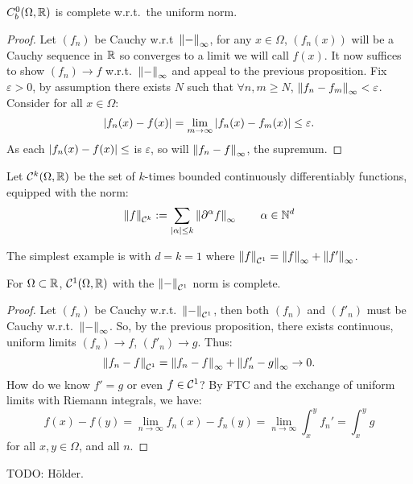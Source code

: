 \documentclass{article}
\begin{document}
\begin{proposition}
    $C_b^0(\Omega,\mathbb{R})$ is complete w.r.t.~the uniform norm.
    \begin{proof}
        Let $(f_n)$ be Cauchy w.r.t~$\left\lVert - \right\rVert_\infty$, for any $x\in \Omega$, $(f_n(x))$ will be a Cauchy sequence in $\mathbb{R}$ so converges to a limit we will call $f(x)$. It now suffices to show $(f_n)\rightarrow f$ w.r.t.~$\left\lVert - \right\rVert_\infty$ and appeal to the previous proposition. Fix $\varepsilon > 0$, by assumption there exists $N$ such that $\forall n,m\geq N$, $\left\lVert f_n-f_m \right\rVert_\infty < \varepsilon$. Consider for all $x\in \Omega$: \[
        \left| f_n(x)-f(x) \right| = \lim_{m\rightarrow\infty}\left| f_n(x)-f_m(x) \right| \leq \varepsilon.
        \] As each $\left| f_n(x)-f(x) \right|\leq$ is  $\varepsilon$, so will $\left\lVert f_n-f \right\rVert_\infty$, the supremum.
    \end{proof}
\end{proposition}

\begin{definition}
    Let $\mathcal{C}^k(\Omega,\mathbb{R})$ be the set of $k$-times bounded continuously differentiably functions, equipped with the norm: \[
    \left\lVert f \right\rVert_{\mathcal{C}^k} := \sum_{\left| \alpha \right|\leq k} \left\lVert \partial^\alpha f \right\rVert_\infty \qquad \alpha \in \mathbb{N}^d
    \]
\end{definition}

The simplest example is with $d=k=1$ where $\left\lVert f \right\rVert_{\mathcal{C}^1} = \left\lVert f \right\rVert_\infty + \left\lVert f' \right\rVert_\infty$.

\begin{proposition}
    For $\Omega\subset \mathbb{R}$, $\mathcal{C}^1(\Omega,\mathbb{R})$ with the $\left\lVert - \right\rVert_{\mathcal{C}^1}$ norm is complete.
    \begin{proof}
        Let $(f_n)$ be Cauchy w.r.t.~$\left\lVert - \right\rVert_{\mathcal{C}^1}$, then both $(f_n)$ and $(f'_n)$ must be Cauchy w.r.t.~$\left\lVert - \right\rVert_\infty$. So, by the previous proposition, there exists continuous, uniform limits $(f_n)\rightarrow f$, $(f'_n)\rightarrow g$. Thus: \[
        \left\lVert f_n-f \right\rVert_{\mathcal{C}^1} = \left\lVert f_n-f \right\rVert_\infty + \left\lVert f'_n-g \right\rVert_\infty \rightarrow 0.\]
        How do we know $f'=g$ or even $f\in\mathcal{C}^1$? By FTC and the exchange of uniform limits with Riemann integrals, we have: \[
        f(x)-f(y) = \lim_{n\rightarrow\infty}f_n(x)-f_n(y) = \lim_{n\rightarrow\infty}\int_x^yf_n' = \int_x^yg
        \] for all $x,y\in\Omega$, and all $n$.
    \end{proof}
\end{proposition}

TODO: H\"older.
\end{document}
